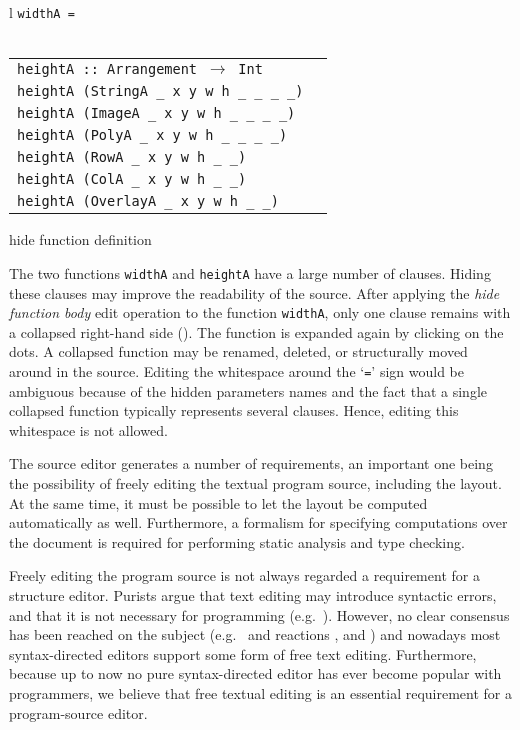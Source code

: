 \documentclass{entcs}
\begin{document}
{\begin{tabular}[t]{l}
{\tt widthA = \framebox{\rule{0cm}{1.5ex}\dots}}\\
\\
\begin{tabular}[t]{@{}l@{}l}
{\tt heightA :: Arrangement $\rightarrow$ Int}\\
{\tt heightA (StringA \_ x y w h \_ \_ \_ \_)}&\p{ = h}\\
{\tt heightA (ImageA \_ x y w h \_ \_ \_ \_)}&\p{ = h}\\
{\tt heightA (PolyA \_ x y w h \_ \_ \_ \_)}&\p{ = h}\\
{\tt heightA (RowA \_ x y w h \_ \_)}&\p{ = h}\\
{\tt heightA (ColA \_ x y w h \_ \_)}&\p{ = h}\\
{\tt heightA (OverlayA \_ x y w h \_ \_)}&\p{ = h}
\end{tabular}
\end{tabular}
}{\small hide function definition}

The two functions \verb|widthA| and \verb|heightA| have a large number of clauses. Hiding these clauses may improve the readability of the source. After applying the {\em hide function body} edit operation to the function \verb|widthA|,  only one clause remains with a collapsed right-hand side (\hspace{0.5pt}{\tt \framebox{\rule{0cm}{1.5ex}\dots}}\hspace{0.5pt}). The function is expanded again by clicking on the dots. A collapsed function may be renamed, deleted, or structurally moved around in the source. Editing the whitespace around the `\verb|=|' sign would be ambiguous because of the hidden parameters names and the fact that a single collapsed function typically represents several clauses. Hence, editing this whitespace is not allowed.


The source editor generates a number of requirements, an important one being the possibility of freely editing the textual program source, including the layout. At the same time, it must be possible to let the layout be computed automatically as well. Furthermore, a formalism for specifying computations over the document is required for performing static analysis and type checking.

Freely editing the program source is not always regarded a requirement for a structure editor. Purists argue that text editing may introduce syntactic errors, and that it is not necessary for programming (e.g.~\cite{teitelbaum81progSynth,magnusson90orm}). However, no clear consensus has been reached on the subject (e.g.~\cite{abandonText82waters} and reactions \cite{shani83notAbandon,responseToWaters83notkin}, and \cite{vanter94practical}) and nowadays most syntax-directed editors support some form of free text editing. Furthermore, because up to now no pure syntax-directed editor has ever become popular with programmers, we believe that free textual editing is an essential requirement for a program-source editor.
\end{document}
